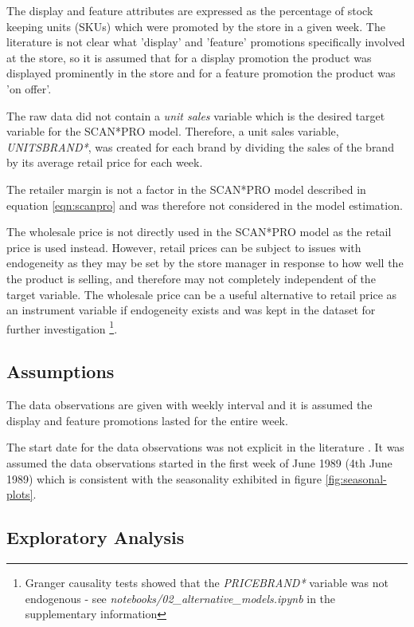 \documentclass[a4paper,11pt]{article}
\begin{document}
The display and feature attributes are expressed as the percentage of stock keeping units (SKUs) which were promoted by the store in a given week. The literature \citep{srinivasan_promotions_2004} is not clear what 'display' and 'feature' promotions specifically involved at the store, so it is assumed that for a display promotion the product was displayed prominently in the store and for a feature promotion the product was 'on offer'. 

The raw data did not contain a \textit{unit sales} variable which is the desired target variable for the SCAN*PRO model. Therefore, a unit sales variable, \textit{UNITSBRAND*}, was created for each brand by dividing the sales of the brand by its average retail price for each week.

The retailer margin is not a factor in the SCAN*PRO model described in equation \ref{eqn:scanpro} and was therefore not considered in the model estimation.

The wholesale price is not directly used in the SCAN*PRO model as the retail price is used instead. However, retail prices can be subject to issues with endogeneity as they may be set by the store manager in response to how well the the product is selling, and therefore may not completely independent of the target variable. The wholesale price can be a useful alternative to retail price as an instrument variable if endogeneity exists and was kept in the dataset for further investigation \footnote{Granger causality tests showed that the \textit{PRICEBRAND*} variable was not endogenous - see \textit{notebooks/02\_alternative\_models.ipynb} in the supplementary information}.



\subsection{Assumptions}
The data observations are given with weekly interval and it is assumed the display and feature promotions lasted for the entire week.

The start date for the data observations was not explicit in the literature \citep{srinivasan_promotions_2004}. It was assumed the data observations started in the first week of June 1989 (4th June 1989) which is consistent with the seasonality exhibited in figure \ref{fig:seasonal-plots}.

\subsection{Exploratory Analysis}
\end{document}

